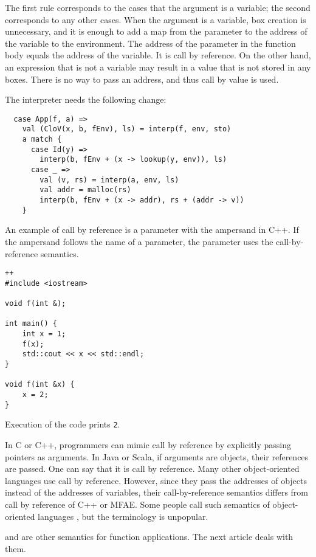 The first rule corresponds to the cases that the argument is a variable; the second corresponds to any other cases. When the argument is a variable, box creation is unnecessary, and it is enough to add a map from the parameter to the address of the variable to the environment. The address of the parameter in the function body equals the address of the variable. It is call by reference. On the other hand, an expression that is not a variable may result in a value that is not stored in any boxes. There is no way to pass an address, and thus call by value is used.

The interpreter needs the following change:

\begin{verbatim}
  case App(f, a) =>
    val (CloV(x, b, fEnv), ls) = interp(f, env, sto)
    a match {
      case Id(y) =>
        interp(b, fEnv + (x -> lookup(y, env)), ls)
      case _ =>
        val (v, rs) = interp(a, env, ls)
        val addr = malloc(rs)
        interp(b, fEnv + (x -> addr), rs + (addr -> v))
    }
\end{verbatim}

An example of call by reference is a parameter with the ampersand in C++. If the ampersand follows the name of a parameter, the parameter uses the call-by-reference semantics.

\begin{verbatim}++
#include <iostream>

void f(int &);

int main() {
    int x = 1;
    f(x);
    std::cout << x << std::endl;
}

void f(int &x) {
    x = 2;
}
\end{verbatim}

Execution of the code prints \verb!2!.

In C or C++, programmers can mimic call by reference by explicitly passing pointers as arguments. In Java or Scala, if arguments are objects, their references are passed. One can say that it is call by reference. Many other object-oriented languages use call by reference. However, since they pass the addresses of objects instead of the addresses of variables, their call-by-reference semantics differs from call by reference of C++ or MFAE. Some people call such semantics of object-oriented languages , but the terminology is unpopular.

 and  are other semantics for function applications. The next article deals with them.

